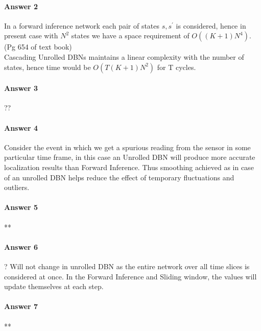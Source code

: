 \documentclass[12pt]{article}
\begin{document}
 
\paragraph{Answer 2}

In a forward inference network each pair of states $s,s^{'}$ is considered, hence in present case with $N^{2}$ states we have a space requirement of $O((K+1)N^{4})$. (Pg 654 of text book)\\
Cascading Unrolled DBNs maintains a linear complexity with the number of states, hence time would be $O(T(K+1)N^{2})$ for T cycles.

\paragraph{Answer 3} ??

\paragraph{Answer 4}
Consider the event in which we get a spurious reading from the sensor in some particular time frame, in this case an Unrolled DBN will produce more accurate localization results than Forward Inference. Thus smoothing achieved as in case of an unrolled DBN helps reduce the effect of temporary fluctuations and outliers.
 
\paragraph{Answer 5} **

\paragraph{Answer 6} ? Will not change in unrolled DBN as the entire network over all time slices is considered at once. In the Forward Inference and Sliding window, the values will update themselves at each step.

\paragraph{Answer 7} **
\end{document}
